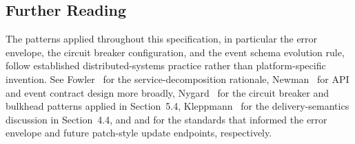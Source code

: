 \subsection{Further Reading}
The patterns applied throughout this specification, in particular the error envelope, the
circuit breaker configuration, and the event schema evolution rule, follow established
distributed-systems practice rather than platform-specific invention. See
Fowler~\cite{fowler2014microservices} for the service-decomposition rationale,
Newman~\cite{newman2021building} for API and event contract design more broadly,
Nygard~\cite{nygard2018release} for the circuit breaker and bulkhead patterns applied in
Section~5.4, Kleppmann~\cite{kleppmann2017designing} for the delivery-semantics discussion in
Section~4.4, and \cite{rfc7807} and \cite{rfc6902} for the standards that informed the
error envelope and future patch-style update endpoints, respectively.
